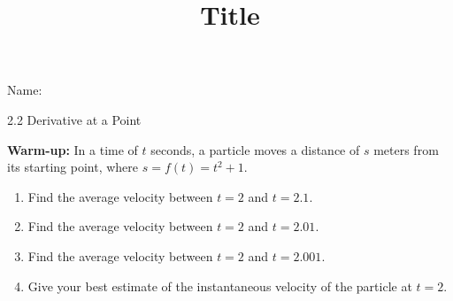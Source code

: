 \documentclass[12pt]{article}
\title{Title}
\begin{document}

 Name:
 \begin{center}\large{2.2 Derivative at a Point}\end{center}

\textbf{Warm-up:}
In a time of $t$ seconds, a particle moves a distance of $s$ meters from its starting point, where $s=f(t)=t^2+1$. 
	\begin{enumerate}
	\item Find the average velocity between $t=2$ and $t=2.1$.
	\vfill
	\item Find the average velocity between $t=2$ and $t=2.01$.
	\vfill
	\item Find the average velocity between $t=2$ and $t=2.001$.
	\vfill
	\item Give your best estimate of the instantaneous velocity of the particle at $t=2$.
	\vfill
	\end{enumerate}
\end{document}
